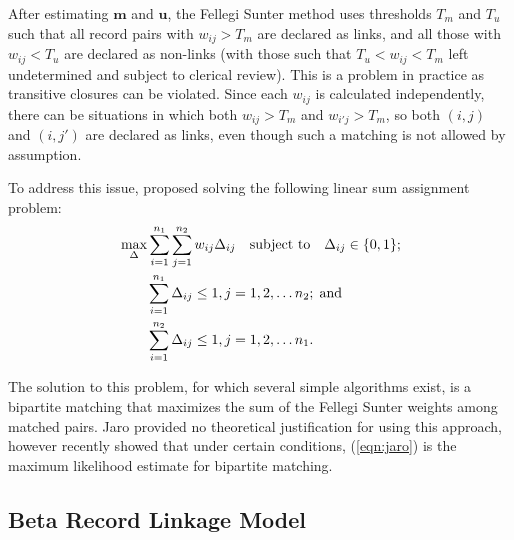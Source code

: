 \documentclass[ba]{imsart}
\begin{document}
After estimating $\bm{m}$ and $\bm{u}$, the Fellegi Sunter method uses thresholds $T_m$ and $T_u$ such that all record pairs with $w_{ij} > T_m$ are declared as links, and all those with $w_{ij} < T_u$ are declared as non-links (with those such that $T_u < w_{ij} < T_m$ left undetermined and subject to clerical review). This is a problem in practice as transitive closures can be violated. Since each $w_{ij}$ is calculated independently, there can be situations in which both $w_{ij} > T_m$ and $w_{i'j} > T_m$, so both $(i,j)$ and $(i, j')$ are declared as links, even though such a matching is not allowed by assumption. 

To address this issue, \cite{jaro1989} proposed solving the following linear sum assignment problem:
\begin{align}
	\label{eqn:jaro}
	&\max_{\Delta} \sum_{i=1}^{n_1} \sum_{j=1}^{n_2} w_{ij} \Delta_{ij} 
	\quad \text{subject to} \quad \Delta_{ij} \in \{0,1\}; \\
	& \quad \quad \sum_{i=1}^{n_1}  \Delta_{ij}  \leq 1, j=1,2, \ldots n_2; \; \text{and} \notag\\
	& \quad \quad\sum_{i=1}^{n_2}  \Delta_{ij}  \leq 1, j=1,2, \ldots n_1. \notag
\end{align}

The solution to this problem, for which several simple algorithms exist, is a bipartite matching that maximizes the sum of the Fellegi Sunter weights among matched pairs. Jaro provided no theoretical justification for using this approach, however \cite{sadinle_bayesian_2017} recently showed that under certain conditions, (\ref{eqn:jaro}) is the maximum likelihood estimate for bipartite matching. 

\subsection{Beta Record Linkage Model}
\label{BRL}
\end{document}
